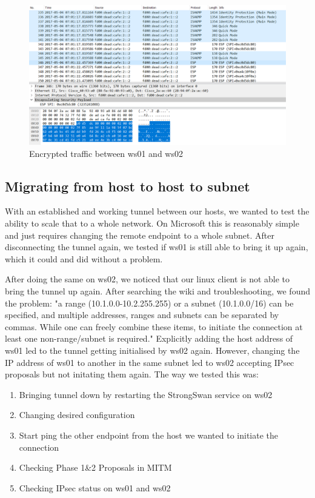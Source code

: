 \documentclass[a4paper]{report}
\begin{document}
\begin{figure}[htb]
	\label{fig:TrafficEnc}
	\includegraphics[width=\linewidth,keepaspectratio]{Traffic_encrypted}
	\caption{Encrypted traffic between ws01 and ws02}
\end{figure}

\subsection{Migrating from host to host to subnet}
\label{ssec:MigHost}
With an established and working tunnel between our hosts, we wanted to test the ability to scale that to a whole network. On Microsoft this is reasonably simple and just requires changing the remote endpoint to a whole subnet. After disconnecting the tunnel again, we tested if ws01 is still able to bring it up again, which it could and did without a problem.

After doing the same on ws02, we noticed that our linux client is not able to bring the tunnel up again. After searching the wiki and troubleshooting, we found the problem: "a range (10.1.0.0-10.2.255.255) or a subnet (10.1.0.0/16) can be specified, and multiple addresses, ranges and subnets can be separated by commas. While one can freely combine these items, to initiate the connection at least one non-range/subnet is required." \parencite{Lang2017StrongSwan}
Explicitly adding the host address of ws01 led to the tunnel getting initialised by ws02 again. However, changing the IP address of ws01 to another in the same subnet led to ws02 accepting IPsec proposals but not initating them again. The way we tested this was:

\begin{enumerate}
	\item Bringing tunnel down by restarting the StrongSwan service on ws02
	\item Changing desired configuration
	\item Start ping the other endpoint from the host we wanted to initiate the connection
	\item Checking Phase 1\&2 Proposals in MITM
	\item Checking IPsec status on ws01 and ws02
\end{enumerate}
\end{document}
